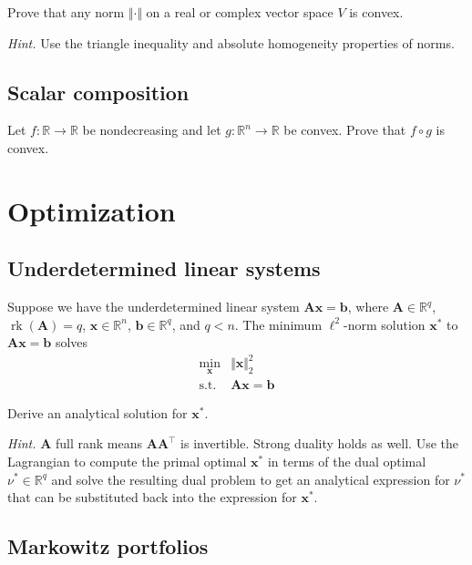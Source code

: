 \documentclass{article}
\numberwithin{equation}{section}
\begin{document}
Prove that any norm $ \Vert\cdot\Vert $ on a real or complex vector space
$ V $ is convex.

\medskip

\textit{Hint.} Use the triangle inequality and absolute homogeneity properties
of norms.

\subsection{Scalar composition}

Let $ f : \mathbb{R} \rightarrow \mathbb{R} $ be nondecreasing and let
$ g : \mathbb{R}^n \rightarrow \mathbb{R} $ be convex. Prove that
$ f \circ g $ is convex.

\section{Optimization}

\subsection{Underdetermined linear systems}

Suppose we have the underdetermined linear system $ \mathbf{Ax} = \mathbf{b} $,
where $ \mathbf{A} \in \mathbb{R}^q $, $ \operatorname{rk}(\mathbf{A}) = q $,
$ \mathbf{x} \in \mathbb{R}^n $, $ \mathbf{b} \in \mathbb{R}^q $, and
$ q < n $. The minimum $ \ell^2 $-norm solution $ \mathbf{x}^* $ to
$ \mathbf{Ax} = \mathbf{b} $ solves
\begin{equation*}
    \begin{array}{ll}
        \displaystyle\min_\mathbf{x} & \Vert\mathbf{x}\Vert_2^2 \\
        \text{s.t.} & \mathbf{Ax} = \mathbf{b}
    \end{array}
\end{equation*}

Derive an analytical solution for $ \mathbf{x}^* $.

\medskip

\textit{Hint.} $ \mathbf{A} $ full rank means $ \mathbf{AA}^\top $ is
invertible. Strong duality holds as well. Use the Lagrangian to compute the
primal optimal $ \mathbf{x}^* $ in terms of the dual optimal
$ \nu^* \in \mathbb{R}^q $ and solve the resulting dual problem to get an
analytical expression for $ \nu^* $ that can be substituted back into the
expression for $ \mathbf{x}^* $.

\subsection{Markowitz portfolios}
\end{document}
